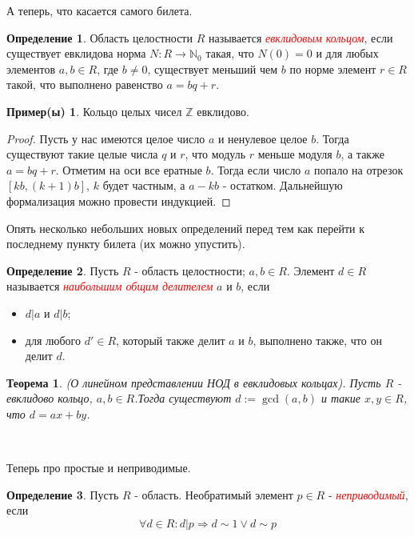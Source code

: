 \documentclass[a4paper,100pt]{article}
\theoremstyle{indented}
\newtheorem{theorem}{Теорема}
\theoremstyle{definition}
\newtheorem{defn}{Определение}
\newtheorem{exl}{Пример(ы)}
\theoremstyle{remark}
\begin{document}
А теперь, что касается самого билета.

\begin{defn}
    Область целостности  $R$ называется \hypertarget{n5}{\textcolor{red}{\textit{евклидовым кольцом}}}, если существует евклидова норма $N: R\rightarrow \mathbb{N}_0$ такая, что $N(0)=0$ и для любых элементов $a, b \in R$, где $b \neq 0$, существует меньший чем $b$ по норме элемент $r\in R$ такой, что выполнено равенство $a=bq+r$.
\end{defn}

\begin{exl}
    Кольцо целых чисел $\mathbb{Z}$ евклидово.
\end{exl}

\begin{proof}
    Пусть у нас имеются целое число $a$ и ненулевое целое $b$. Тогда существуют такие целые числа $q$ и $r$, что модуль $r$ меньше модуля $b$, а также $a=bq+r$. Отметим на оси все ератные $b$. Тогда если число $a$ попало на отрезок $[kb, (k+1)b]$, $k$ будет частным, а $a-kb$ - остатком. Дальнейшую формализация можно провести индукцией.
\end{proof}

Опять несколько небольших новых определений перед тем как перейти к последнему пункту билета (их можно упустить).

\begin{defn}
    Пусть $R$ - область целостности; $a,b\in R$. Элемент $d\in R$ называется \hypertarget{n6}{\textcolor{red}{\textit{наибольшим общим делителем}}} $a$ и $b$, если 
    \begin{itemize}
        \item $d|a$ и $d|b$;
        \item для любого $d'\in R$, который также делит $a$ и $b$, выполнено также, что он делит $d$.
    \end{itemize}
\end{defn}

\begin{theorem}
    (О линейном представлении НОД в евклидовых кольцах). Пусть $R$ - евклидово кольцо, $a, b\in R$.Тогда существуют $d:=\gcd (a,b)$ и такие $x,y\in R$, что $d=ax+by$.
\end{theorem}\

Теперь про простые и неприводимые.

\begin{defn}
    Пусть $R$ - область. Необратимый элемент $p\in R$ - \hypertarget{n7}{\textcolor{red}{\textit{неприводимый}}}, если 
    \[
        \forall d\in R:d\vert p \Longrightarrow d\sim 1 \vee d\sim p
    \]
\end{defn}
\end{document}
